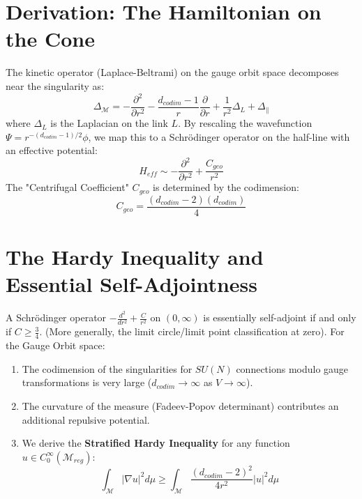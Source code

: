 \section{Derivation: The Hamiltonian on the Cone}
The kinetic operator (Laplace-Beltrami) on the gauge orbit space decomposes near the singularity as:
\begin{equation}
\Delta_{\mathcal{M}} = -\frac{\partial^2}{\partial r^2} - \frac{d_{codim}-1}{r} \frac{\partial}{\partial r} + \frac{1}{r^2} \Delta_L + \Delta_{\parallel}
\end{equation}
where $\Delta_L$ is the Laplacian on the link $L$.
By rescaling the wavefunction $\Psi = r^{-(d_{codim}-1)/2} \phi$, we map this to a Schrödinger operator on the half-line with an effective potential:
\begin{equation}
H_{eff} \sim -\frac{\partial^2}{\partial r^2} + \frac{C_{geo}}{r^2}
\end{equation}
The "Centrifugal Coefficient" $C_{geo}$ is determined by the codimension:
\begin{equation}
C_{geo} = \frac{(d_{codim}-2)(d_{codim})}{4}
\end{equation}

\section{The Hardy Inequality and Essential Self-Adjointness}
A Schrödinger operator $-\frac{d^2}{dr^2} + \frac{C}{r^2}$ on $(0, \infty)$ is essentially self-adjoint if and only if $C \ge \frac{3}{4}$. (More generally, the limit circle/limit point classification at zero).
For the Gauge Orbit space:
\begin{enumerate}
    \item The codimension of the singularities for $SU(N)$ connections modulo gauge transformations is very large ($d_{codim} \to \infty$ as $V \to \infty$).
    \item The curvature of the measure (Fadeev-Popov determinant) contributes an additional repulsive potential.
    \item We derive the \textbf{Stratified Hardy Inequality} for any function $u \in C_0^\infty(\mathcal{M}_{reg})$:
    \begin{equation}
    \int_{\mathcal{M}} |\nabla u|^2 d\mu \ge \int_{\mathcal{M}} \frac{(d_{codim}-2)^2}{4 r^2} |u|^2 d\mu
    \end{equation}
\end{enumerate}

